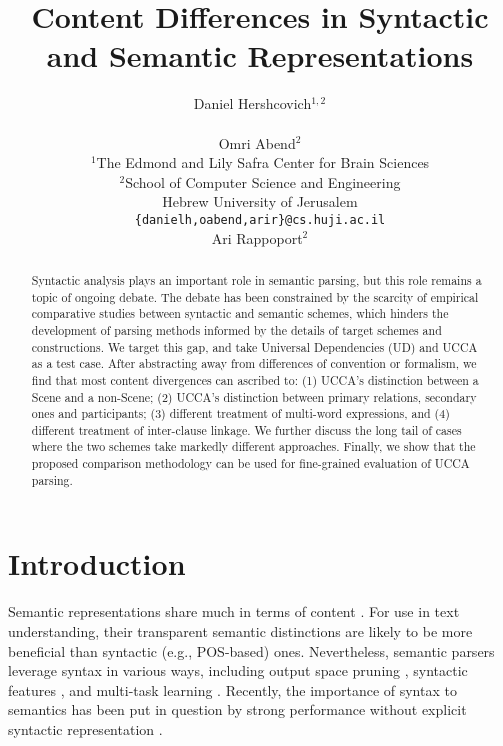 \documentclass[11pt,a4paper]{article}
\title{Content Differences in Syntactic and Semantic Representations}
\author{Daniel Hershcovich$^{1,2}$ \\
  \\\And
  Omri Abend$^2$ \\
  $^1$The Edmond and Lily Safra Center for Brain Sciences \\
  $^2$School of Computer Science and Engineering \\
  Hebrew University of Jerusalem \\
  \texttt{\{danielh,oabend,arir\}@cs.huji.ac.il}
  \\\And
  Ari Rappoport$^2$
}
\date{}
\begin{document}
\maketitle

\begin{abstract}

  Syntactic analysis plays an important role in semantic parsing,
  but this role remains a topic of ongoing debate.
  The debate has been constrained by the scarcity of empirical comparative studies between syntactic and semantic schemes,
  which hinders the development of parsing methods informed by the details of target schemes and constructions.
  We target this gap, and take Universal Dependencies (UD) and UCCA as a test case.
  After abstracting away from differences of convention or formalism,
  we find that most content divergences can ascribed to: 
  (1) UCCA's distinction between a Scene and a non-Scene; %
  (2) UCCA's distinction between primary relations, secondary ones and participants; %
  (3) different treatment of multi-word expressions, and
  (4) different treatment of inter-clause linkage.
  We further discuss the long tail of cases where the two schemes take markedly
  different approaches.
  Finally, we show that the proposed comparison methodology can be used
  for fine-grained evaluation of UCCA parsing.
\end{abstract}


\section{Introduction}\label{sec:introduction}
  
  Semantic representations share much in terms of content \cite{abend2017state}.
  For use in text understanding, their transparent semantic distinctions are likely to be
  more beneficial than syntactic (e.g., POS-based) ones.
  Nevertheless, semantic parsers leverage syntax in various ways,
  including output space pruning \cite{xue2004calibrating}, 
  syntactic features \cite{gildea2002automatic,N15-1007,E17-1045}, and
  multi-task learning \cite{swayamdipta2016greedy,swayamdipta2018syntactic,strubell2018linguistically}.
  Recently, the importance of syntax to semantics has been put in question
  by strong performance without explicit syntactic representation
  \cite{Peng-EtAl:2018:NAACL,P18-2077,P18-1192,C18-1233}.
\end{document}
